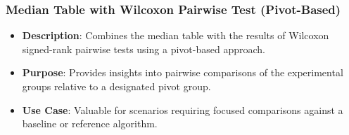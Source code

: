 \documentclass[11pt]{article}
\providecommand{\tightlist}{%
      \setlength{\itemsep}{0pt}\setlength{\parskip}{0pt}}
\begin{document}
\subsubsection{Median Table with Wilcoxon Pairwise Test (Pivot-Based)}
\begin{itemize}
  \tightlist
  \item
    \textbf{Description}: Combines the median table with the results of
    Wilcoxon signed-rank pairwise tests using a pivot-based approach.\\
  \item
    \textbf{Purpose}: Provides insights into pairwise comparisons of the
    experimental groups relative to a designated pivot group.\\
  \item
    \textbf{Use Case}: Valuable for scenarios requiring focused
    comparisons against a baseline or reference algorithm.
  \end{itemize}
\end{document}

